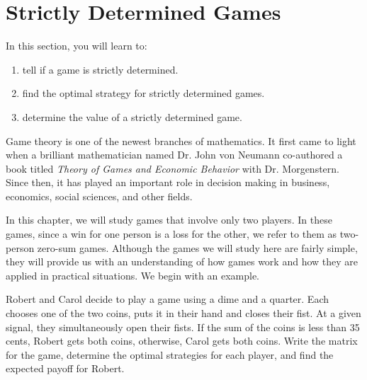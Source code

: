 \section{Strictly Determined Games}

In this section, you will learn to:
\begin{enumerate}
    \item tell if a game is strictly determined.
    \item find the optimal strategy for strictly determined games.
    \item determine the value of a strictly determined game.
\end{enumerate}

Game theory is one of the newest branches of mathematics. It first came to light when a brilliant mathematician named Dr. John von Neumann co-authored a book titled \textit{Theory of Games and Economic Behavior} with Dr. Morgenstern. Since then, it has played an important role in decision making in business, economics, social sciences, and other fields.

In this chapter, we will study games that involve only two players. In these games, since a win for one person is a loss for the other, we refer to them as two-person zero-sum games. Although the games we will study here are fairly simple, they will provide us with an understanding of how games work and how they are applied in practical situations. We begin with an example.

\begin{example}
    Robert and Carol decide to play a game using a dime and a quarter. Each chooses one of the two coins, puts it in their hand and closes their fist. At a given signal, they simultaneously open their fists. If the sum of the coins is less than 35 cents, Robert gets both coins, otherwise, Carol gets both coins. Write the matrix for the game, determine the optimal strategies for each player, and find the expected payoff for Robert.
\end{example}

